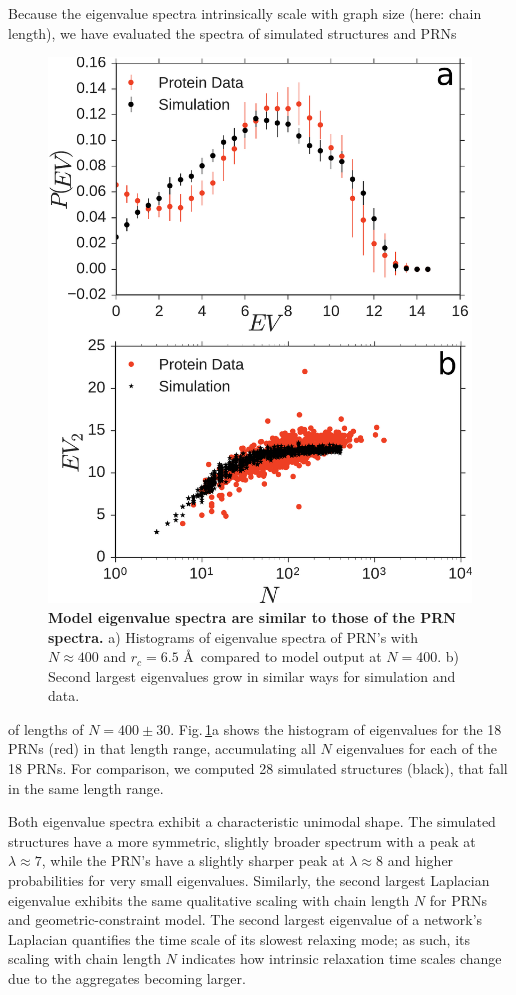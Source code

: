 \documentclass[9pt]{elife}
\begin{document}
Because the eigenvalue spectra intrinsically scale with graph size (here: chain length), we have evaluated the spectra of simulated structures and PRNs
\begin{figure}[h]
        \centering
	\includegraphics[width=0.8\columnwidth]{evplots}
        \caption{\textbf{Model eigenvalue spectra are similar to those of the PRN spectra.} a) Histograms of eigenvalue spectra of PRN's with $N\approx400$ and $r_c=6.5$ \AA\, compared to model output at $N=400$. b) Second largest eigenvalues grow in similar ways for simulation and data.} 
        \label{fig.spec}
\end{figure}
 of lengths of $N=400 \pm 30$. Fig.\,\ref{fig.spec}a shows the histogram of eigenvalues for the 18 PRNs (red) in that length range, accumulating all $N$ eigenvalues for each of the 18 PRNs. For comparison, we computed 28 simulated structures (black), that fall in the same length range.

Both eigenvalue spectra exhibit a characteristic unimodal shape. The simulated structures have a more symmetric, slightly broader spectrum with a peak at $\lambda \approx 7$, while the PRN's have a slightly sharper peak at $\lambda\approx 8$ and higher probabilities for very small eigenvalues. Similarly, the second largest Laplacian eigenvalue exhibits the same qualitative scaling with chain length $N$ for PRNs and geometric-constraint model. The second largest eigenvalue of a network's Laplacian quantifies the time scale of its slowest relaxing mode; as such, its scaling with chain length $N$ indicates how intrinsic relaxation time scales change due to the aggregates becoming larger.
\end{document}

